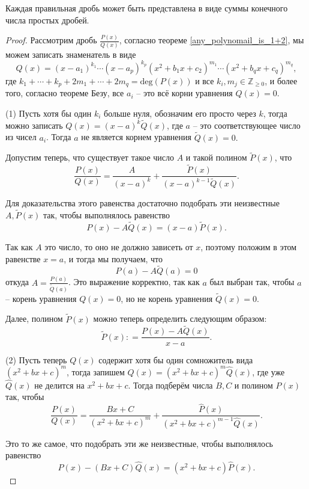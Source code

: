 \begin{theorem}\label{decomp_of_fraction}
    Каждая правильная дробь может быть представлена в виде суммы конечного числа простых дробей.
\end{theorem}
\begin{proof}
Рассмотрим дробь $\frac{P(x)}{Q(x)}$, согласно теореме \ref{any_polynomail_is_1+2}, мы можем записать знаменатель в виде 
 \[
 Q(x) = (x - a_1)^{k_1} \cdots (x-a_p)^{k_p} (x^2 + b_1x + c_2)^{m_1}\cdots (x^2 + b_qx + c_q)^{m_q}, 
    \]
    где $k_1 + \cdots + k_p + 2m_1 + \cdots + 2m_q = \mathrm{deg}(P(x))$ и все $k_i, m_j \in \mathbb{Z}_{\ge 0}$, и более того, согласно теореме Безу, все $a_i$ -- это всё корни уравнения $Q(x) =0.$

(1) Пусть хотя бы один $k_i$ больше нуля, обозначим его просто через $k$, тогда можно записать $Q(x) = (x-a)^k \widetilde{Q}(x)$, где $a$ -- это соответствующее число из чисел $a_i$. Тогда $a$ не является корнем уравнения $\widetilde{Q}(x) =0.$

Допустим теперь, что существует такое число $A$ и такой полином $\widetilde{P}(x)$, что 
\[
 \frac{P(x)}{Q(x)} = \frac{A}{(x-a)^k} + \frac{\widetilde{P}(x)}{(x-a)^{k-1}\widetilde{Q}(x)}.
\]

Для доказательства этого равенства достаточно подобрать эти неизвестные $A, \widetilde{P}(x)$ так, чтобы выполнялось равенство
\[
 P(x) - A \widetilde{Q}(x) = (x-a)\widetilde{P}(x).
\]

Так как $A$ это число, то оно не должно зависеть от $x$, поэтому положим в этом равенстве $x = a$, и тогда мы получаем, что
\[
 P(a) - A \widetilde{Q}(a) = 0
\]
откуда $A = \frac{P(a)}{\widetilde{Q}(a)}$. Это выражение корректно, так как $a$ был выбран так, чтобы $a$ -- корень уравнения $Q(x) =0$, но не корень уравнения $\widetilde{Q}(x) = 0.$

Далее, полином $\widetilde{P}(x)$ можно теперь определить следующим образом:
\[
 \widetilde{P}(x): = \frac{P(x) - A \widetilde{Q}(x)}{x-a}.
\]

(2) Пусть теперь $Q(x)$ содержит хотя бы один сомножитель вида $(x^2 + bx + c)^m$, тогда запишем $Q(x)= (x^2 + bx + c)^m \widehat{Q}(x)$, где уже $\widehat{Q}(x)$ не делится на $x^2 + bx + c$. Тогда подберём числа $B,C$ и полином $\widehat{P}(x)$ так, чтобы
\[
 \frac{P(x)}{Q(x)} = \frac{Bx + C}{(x^2 + bx + c)^m} + \frac{\widehat{P}(x)}{(x^2 + bx + c)^{m-1} \widehat{Q}(x)}.
\]

Это то же самое, что подобрать эти же неизвестные, чтобы выполнялось равенство
\[
 P(x) - (Bx +C)\widehat{Q}(x) = (x^2 + bx + c) \widehat{P}(x).
\]


\end{proof}
